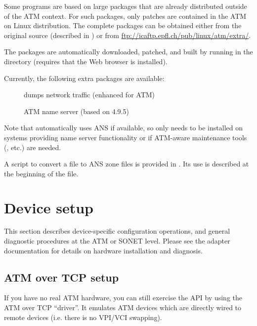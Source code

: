 Some programs are based on large packages that are already distributed
outside of the ATM context. For such packages, only patches are contained
in the ATM on Linux distribution. The complete packages can be obtained
either from the original source (described in )
or from \url{ftp://icaftp.epfl.ch/pub/linux/atm/extra/}.

The packages are automatically downloaded, patched, and built by running
 in the  directory
(requires that the  Web browser is installed).

Currently, the following extra packages are available:
\begin{description}
  \item[] dumps network traffic (enhanced for ATM)
  \item[] ATM name server (based on  4.9.5)
\end{description}

Note that  automatically uses ANS if available, so
 only needs to be installed on systems providing
name server functionality or if ATM-aware maintenance tools
(, etc.) are needed.

A script  to convert a  file to
ANS zone files is provided in . Its use is described at
the beginning of the file.




\section{Device setup}

This section describes device-specific configuration operations, and general
diagnostic procedures at the ATM or SONET level. Please see the adapter
documentation for details on hardware installation and diagnosis.


\subsection{ATM over TCP setup}

If you have no real ATM hardware, you can still exercise the API by using
the ATM over TCP ``driver''. It emulates ATM devices which are directly
wired to remote devices (i.e. there is no VPI/VCI swapping).

